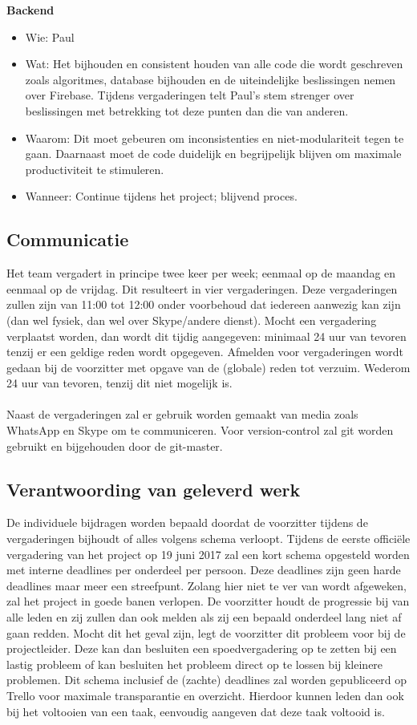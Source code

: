 \documentclass{uva-inf-article}
\begin{document}
\textbf{Backend}
\begin{itemize}
\item Wie: Paul
\item Wat: Het bijhouden en consistent houden van alle code die wordt geschreven zoals algoritmes, database bijhouden en de uiteindelijke beslissingen nemen over Firebase. Tijdens vergaderingen telt Paul's stem strenger over beslissingen met betrekking tot deze punten dan die van anderen.
\item Waarom: Dit moet gebeuren om inconsistenties en niet-modulariteit tegen te gaan. Daarnaast moet de code duidelijk en begrijpelijk blijven om maximale productiviteit te stimuleren.
\item Wanneer: Continue tijdens het project; blijvend proces.
\end{itemize}

\subsection{Communicatie}
Het team vergadert in principe twee keer per week; eenmaal op de maandag en eenmaal op de vrijdag. Dit resulteert in vier vergaderingen. Deze vergaderingen zullen zijn van 11:00 tot 12:00 onder voorbehoud dat iedereen aanwezig kan zijn (dan wel fysiek, dan wel over Skype/andere dienst).
Mocht een vergadering verplaatst worden, dan wordt dit tijdig aangegeven: minimaal 24 uur van tevoren tenzij er een geldige reden wordt opgegeven.
Afmelden voor vergaderingen wordt gedaan bij de voorzitter met opgave van de (globale) reden tot verzuim. Wederom 24 uur van tevoren, tenzij dit niet mogelijk is.\\\\
\noindent
Naast de vergaderingen zal er gebruik worden gemaakt van media zoals WhatsApp en Skype om te communiceren. Voor version-control zal git worden gebruikt en bijgehouden door de git-master.

\subsection{Verantwoording van geleverd werk}
De individuele bijdragen worden bepaald doordat de voorzitter tijdens de vergaderingen bijhoudt of alles volgens schema verloopt. Tijdens de eerste offici\"ele vergadering van het project op 19 juni 2017 zal een kort schema opgesteld worden met interne deadlines per onderdeel per persoon. Deze deadlines zijn geen harde deadlines maar meer een streefpunt. Zolang hier niet te ver van wordt afgeweken, zal het project in goede banen verlopen. De voorzitter houdt de progressie bij van alle leden en zij zullen dan ook melden als zij een bepaald onderdeel lang niet af gaan redden. Mocht dit het geval zijn, legt de voorzitter dit probleem voor bij de projectleider. Deze kan dan besluiten een spoedvergadering op te zetten bij een lastig probleem of kan besluiten het probleem direct op te lossen bij kleinere problemen.
Dit schema inclusief de (zachte) deadlines zal worden gepubliceerd op Trello
voor maximale transparantie en overzicht. Hierdoor kunnen leden dan ook bij het voltooien van een taak, eenvoudig aangeven dat deze taak voltooid is.
\end{document}
